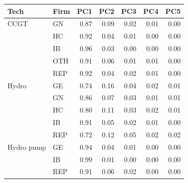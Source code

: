 \begin{tabular}{l l r r r r r}
\toprule
Tech & Firm & PC1 & PC2 & PC3 & PC4 & PC5 \\
\midrule
CCGT & GN & 0.87 & 0.09 & 0.02 & 0.01 & 0.00 \\
 & HC & 0.92 & 0.04 & 0.01 & 0.00 & 0.00 \\
 & IB & 0.96 & 0.03 & 0.00 & 0.00 & 0.00 \\
 & OTH & 0.91 & 0.06 & 0.01 & 0.01 & 0.00 \\
 & REP & 0.92 & 0.04 & 0.02 & 0.01 & 0.00 \\
Hydro & GE & 0.74 & 0.16 & 0.04 & 0.02 & 0.01 \\
 & GN & 0.86 & 0.07 & 0.03 & 0.01 & 0.01 \\
 & HC & 0.80 & 0.11 & 0.03 & 0.02 & 0.01 \\
 & IB & 0.91 & 0.05 & 0.02 & 0.01 & 0.00 \\
 & REP & 0.72 & 0.12 & 0.05 & 0.02 & 0.02 \\
Hydro pump & GE & 0.94 & 0.04 & 0.01 & 0.00 & 0.00 \\
 & IB & 0.99 & 0.01 & 0.00 & 0.00 & 0.00 \\
 & REP & 0.91 & 0.06 & 0.02 & 0.00 & 0.00 \\
\bottomrule
\end{tabular}